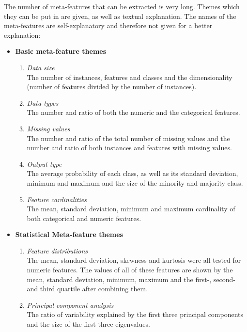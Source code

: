 \documentclass[10pt,a4paper]{report}
\begin{document}
	The number of meta-features that can be extracted is very long. Themes which they can be put in are given, as well as textual explanation. The names of the meta-features are self-explanatory and therefore not given for a better explanation:
	
	\begin{itemize}
		\item \textbf{Basic meta-feature themes}\\
		\begin{enumerate}
			\item \textit{Data size} \\
			The number of instances, features and classes and the dimensionality (number of features divided by the number of instances).
			\item \textit{Data types} \\
			The number and ratio of both the numeric and the categorical features.
			\item \textit{Missing values} \\
			The number and ratio of the total number of missing values and the number and ratio of both instances and features with missing values.
			\item \textit{Output type} \\
			The average probability of each class, as well as its standard deviation, minimum and maximum and the size of the minority and majority class.
			\item \textit{Feature cardinalities} \\
			The mean, standard deviation, minimum and maximum cardinality of both categorical and numeric features.
		\end{enumerate}
		\item \textbf{Statistical Meta-feature themes} \\
		\begin{enumerate}
			\item \textit{Feature distributions} \\
			The mean, standard deviation, skewness and kurtosis were all tested for numeric features. The values of all of these features are shown by the mean, standard deviation, minimum, maximum and the first-, second- and third quartile after combining them.   
			\item \textit{Principal component analysis} \\
			The ratio of variability explained by the first three principal components and the size of the first three eigenvalues.
		\end{enumerate}

\end{itemize}
\end{document}
